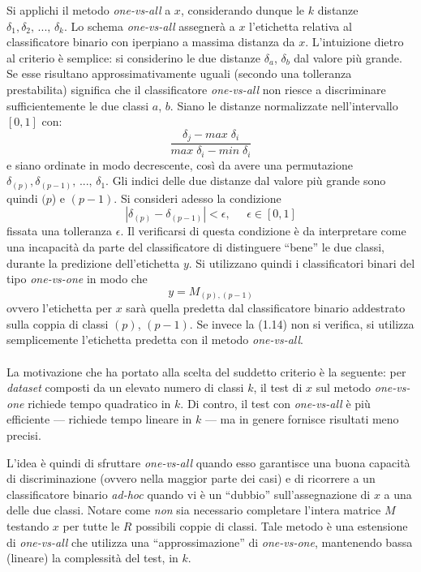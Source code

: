 Si applichi il metodo \textit{one-vs-all} a $x$, considerando dunque le $k$ distanze $\delta_1, \delta_2, \, ..., \, \delta_k$. Lo schema \textit{one-vs-all} assegnerà a $x$ l'etichetta relativa al classificatore binario con iperpiano a massima distanza da $x$. L'intuizione dietro al criterio è semplice: si considerino le due distanze $\delta_a$, $\delta_b$ dal valore più grande. Se esse risultano approssimativamente uguali (secondo una tolleranza prestabilita) significa che il classificatore \textit{one-vs-all} non riesce a discriminare sufficientemente le due classi $a$, $b$.
Siano le distanze normalizzate nell'intervallo $[0,1]$ con:
\begin{equation}
	\frac{\delta_j - max \; \delta_i }{ max \; \delta_i - min \; \delta_i }
\end{equation}
e siano ordinate in modo decrescente, così da avere una permutazione $\delta_{(p)}, \delta_{(p-1)}, \, ... , \, \delta_1$.
Gli indici delle due distanze dal valore più grande sono quindi $(p$) e $(p-1)$. Si consideri adesso la condizione
\begin{equation}
	| \delta_{(p)} - \delta_{(p-1)} | < \epsilon ,\;\;\;\;\; \epsilon \in [0,1]
\end{equation}
fissata una tolleranza $\epsilon$.
Il verificarsi di questa condizione è da interpretare come una incapacità da parte del classificatore di distinguere ``bene'' le due classi, durante la predizione dell'etichetta $y$.
Si utilizzano quindi i classificatori binari del tipo \textit{one-vs-one} in modo che
\begin{equation}
	y = M_{(p), (p-1)}
\end{equation}
ovvero l'etichetta per $x$ sarà quella predetta dal classificatore binario addestrato sulla coppia di classi $(p)$, $(p-1)$. Se invece la (1.14) non si verifica, si utilizza semplicemente l'etichetta predetta con il metodo \textit{one-vs-all}.

\paragraph{}
La motivazione che ha portato alla scelta del suddetto criterio è la seguente: per \textit{dataset} composti da un elevato numero di classi $k$, il test di $x$ sul metodo \textit{one-vs-one} richiede tempo quadratico in $k$.
Di contro, il test con \textit{one-vs-all} è più efficiente --- richiede tempo lineare in $k$ --- ma in genere fornisce risultati meno precisi.

L'idea è quindi di sfruttare \textit{one-vs-all} quando esso garantisce una buona capacità di discriminazione (ovvero nella maggior parte dei casi) e di ricorrere a un classificatore binario \textit{ad-hoc} quando vi è un ``dubbio'' sull'assegnazione di $x$ a una delle due classi.
Notare come \textit{non} sia necessario completare l'intera matrice $M$ testando $x$ per tutte le $R$ possibili coppie di classi. Tale metodo è una estensione di \textit{one-vs-all} che utilizza una ``approssimazione'' di \textit{one-vs-one}, mantenendo bassa (lineare) la complessità del test, in $k$.

